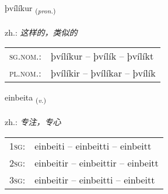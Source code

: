 \documentclass[frontgrid, backgrid]{flacards}\usepackage[]{graphicx}\usepackage[]{xcolor}
\begin{document}
\renewcommand{\blhead}{\vskip5pt {\small\bfseries\footnotesize Fornafn | 代词 }}
\renewcommand{\bcfoot}{\vskip5pt \hspace{2pt}{\small\bfseries\footnotesize 3K}}


{þvílíkur \small{\textsubscript{(\textit{pron.})}} \\[1ex] %
\textphonetic{[θviːlikʏr]} \\
zh.: \emph{这样的，类似的} \\  [2ex]
\renewcommand*{\arraystretch}{0.8}
\begin{tabular}{ll}
\textsc{sg.nom.}: & þvílíkur  --  þvílík -- þvílíkt \\ 
\textsc{pl.nom.}: & þvílíkir -- þvílíkar -- þvílík
\end{tabular}
}

\renewcommand{\flhead}{\vskip5pt \fboxsep=0pt {\small\bfseries\footnotesize Sagnorð | 动词}}
\renewcommand{\fcfoot}{\vskip5pt \fboxsep=0pt \hspace{2pt}{\small\bfseries\footnotesize 3K}}

\renewcommand{\blhead}{\vskip5pt {\small\bfseries\footnotesize Sagnorð | 动词 }}
\renewcommand{\bcfoot}{\vskip5pt \hspace{2pt}{\small\bfseries\footnotesize 3K}}


{einbeita \small{\textsubscript{(\textit{v.})}} \\[1ex] %
\textphonetic{[einpeita]} \\
zh.: \emph{专注，专心} \\  [2ex]
\renewcommand*{\arraystretch}{0.8}
\begin{tabular}{p{1cm}l}
\textsc{1sg}: & einbeiti -- einbeitti -- einbeitt \\ 
\textsc{2sg}: & einbeitir -- einbeittir -- einbeitt \\ 
\textsc{3sg}: & einbeitir -- einbeitti -- einbeitt \\ 
\end{tabular}
}

\renewcommand{\flhead}{\vskip5pt \fboxsep=0pt {\small\bfseries\footnotesize Nafnorð | 名词}}
\renewcommand{\fcfoot}{\vskip5pt \fboxsep=0pt \hspace{2pt}{\small\bfseries\footnotesize 3K}}
\end{document}
